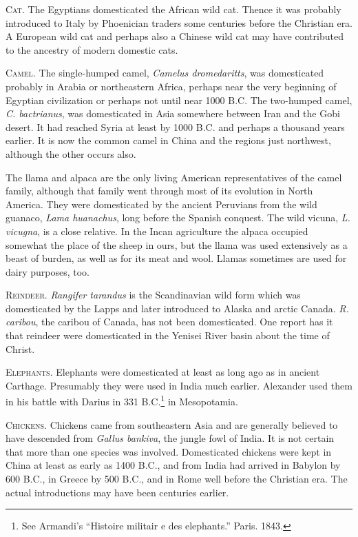 \textsc{Cat}. The Egyptians domesticated the African wild cat. Thence it was probably introduced to Italy by Phoenician 
traders some centuries before the Christian era. A European wild cat and perhaps also a Chinese wild cat may have 
contributed to the ancestry of modern domestic cats. 

\textsc{Camel}. The single-humped camel, \textit{Camelus dromedaritts}, was domesticated probably in Arabia or 
northeastern Africa, perhaps near the very beginning of Egyptian civilization or perhaps not until near 1000 B.C.
The two-humped camel, \textit{C. bactrianus}, was domesticated in Asia somewhere between Iran and the Gobi desert.
It had reached Syria at least by 1000 B.C. and perhaps a thousand years earlier. It is now the common camel in China
and the regions just northwest, although the other occurs also. 

The llama and alpaca are the only living American representatives of the camel family, although that family went
through most of its evolution in North America. They were domesticated by the ancient Peruvians from the wild
guanaco, \textit{Lama huanachus}, long before the Spanish conquest. The wild vicuna, \textit{L. vicugna}, is a close
relative. In the Incan agriculture the alpaca occupied somewhat the place of the sheep in ours, but the llama was used 
extensively as a beast of burden, as well as for its meat and wool. Llamas sometimes are used for dairy purposes, too. 

\textsc{Reindeer}. \textit{Rangifer tarandus} is the Scandinavian wild form which was domesticated by the Lapps
and later introduced to Alaska and arctic Canada. \textit{R. caribou}, the caribou of Canada, has not been
domesticated. One report has it that reindeer were domesticated in the Yenisei River basin about the time of Christ. 

\textsc{Elephants}. Elephants were domesticated at least as long ago as in ancient Carthage. Presumably they were
used in India much earlier. Alexander used them in his battle with Darius in 331
B.C.\footnote{See Armandi's ``Histoire militair e des elephants.'' Paris. 1843.} in Mesopotamia. 

\textsc{Chickens}. Chickens came from southeastern Asia and are generally believed to have descended from
\textit{Gallus bankiva}, the jungle fowl of India. It is not certain that more than one species was involved. 
Domesticated chickens were kept in China at least as early as 1400 B.C., and from India had arrived in Babylon by 600
B.C., in Greece by 500 B.C., and in Rome well before the Christian era. The actual introductions may have been
centuries earlier. 


